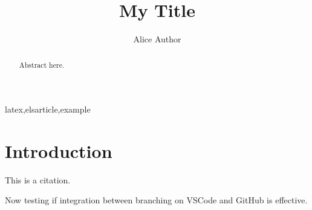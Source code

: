 \documentclass[3p,twocolumn]{elsarticle}
\begin{document}
\begin{frontmatter}
\title{My Title}
\author[inst1]{Alice Author}
\address[inst1]{University}
\begin{abstract}Abstract here.\end{abstract}
\begin{keyword}latex\sep elsarticle\sep example\end{keyword}
\end{frontmatter}

\section{Introduction}
This is a citation.\cite{JONES2020256HgHe}

Now testing if integration between branching on VSCode and GitHub is effective.



\end{document}

